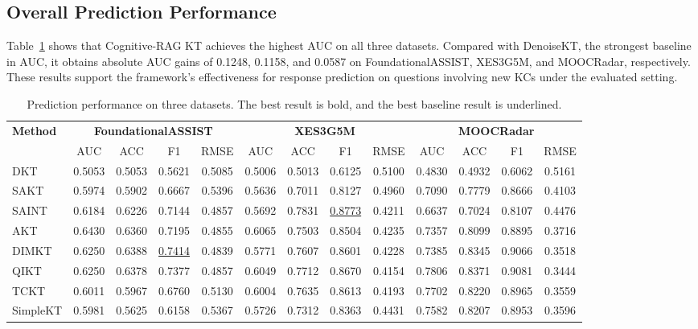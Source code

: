 \documentclass{llncs}
\begin{document}
\subsection{Overall Prediction Performance}

Table~\ref{tab:main-results} shows that Cognitive-RAG KT achieves the highest AUC on all three datasets. Compared with DenoiseKT, the strongest baseline in AUC, it obtains absolute AUC gains of 0.1248, 0.1158, and 0.0587 on FoundationalASSIST, XES3G5M, and MOOCRadar, respectively. These results support the framework's effectiveness for response prediction on questions involving new KCs under the evaluated setting.

\begin{table}[t]
\centering
\scriptsize
\setlength{\tabcolsep}{1.5pt}
\renewcommand{\arraystretch}{1.05}
\caption{Prediction performance on three datasets. The best result is bold, and the best baseline result is underlined.}
\label{tab:main-results}
\begin{tabular}{@{}l*{12}{c}@{}}
\toprule
\multirow{2}{*}{\textbf{Method}}
& \multicolumn{4}{c}{\textbf{FoundationalASSIST}}
& \multicolumn{4}{c}{\textbf{XES3G5M}}
& \multicolumn{4}{c}{\textbf{MOOCRadar}} \\
\cmidrule(lr){2-5}
\cmidrule(lr){6-9}
\cmidrule(lr){10-13}
& AUC & ACC & F1 & RMSE
& AUC & ACC & F1 & RMSE
& AUC & ACC & F1 & RMSE \\
\midrule
DKT & 0.5053 & 0.5053 & 0.5621 & 0.5085 & 0.5006 & 0.5013 & 0.6125 & 0.5100 & 0.4830 & 0.4932 & 0.6062 & 0.5161 \\
SAKT & 0.5974 & 0.5902 & 0.6667 & 0.5396 & 0.5636 & 0.7011 & 0.8127 & 0.4960 & 0.7090 & 0.7779 & 0.8666 & 0.4103 \\
SAINT & 0.6184 & 0.6226 & 0.7144 & 0.4857 & 0.5692 & 0.7831 & \underline{0.8773} & 0.4211 & 0.6637 & 0.7024 & 0.8107 & 0.4476 \\
AKT & 0.6430 & 0.6360 & 0.7195 & 0.4855 & 0.6065 & 0.7503 & 0.8504 & 0.4235 & 0.7357 & 0.8099 & 0.8895 & 0.3716 \\
DIMKT & 0.6250 & 0.6388 & \underline{0.7414} & 0.4839 & 0.5771 & 0.7607 & 0.8601 & 0.4228 & 0.7385 & 0.8345 & 0.9066 & 0.3518 \\
QIKT & 0.6250 & 0.6378 & 0.7377 & 0.4857 & 0.6049 & 0.7712 & 0.8670 & 0.4154 & 0.7806 & 0.8371 & 0.9081 & 0.3444 \\
TCKT & 0.6011 & 0.5967 & 0.6760 & 0.5130 & 0.6004 & 0.7635 & 0.8613 & 0.4193 & 0.7702 & 0.8220 & 0.8965 & 0.3559 \\
SimpleKT & 0.5981 & 0.5625 & 0.6158 & 0.5367 & 0.5726 & 0.7312 & 0.8363 & 0.4431 & 0.7582 & 0.8207 & 0.8953 & 0.3596 \\

\end{tabular}
\end{table}
\end{document}
